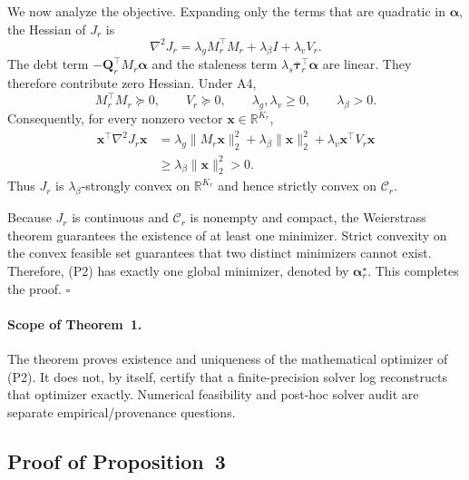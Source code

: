 We now analyze the objective.  Expanding only the terms that are quadratic in
$\boldsymbol\alpha$, the Hessian of $J_r$ is
\begin{equation}
 \nabla^2J_r
 =
 \lambda_gM_r^{\top}M_r
 +
 \lambda_{\beta}I
 +
 \lambda_vV_r.
 \label{eq:app_P2_hessian}
\end{equation}
The debt term
$-\mathbf{Q}_r^{\top}M_r\boldsymbol\alpha$ and the staleness term
$\lambda_s\overline{\boldsymbol\tau}_r^{\top}\boldsymbol\alpha$ are linear.
They therefore contribute zero Hessian.  Under A4,
\begin{equation}
    M_r^{\top}M_r\succeq0,
    \qquad
    V_r\succeq0,
    \qquad
    \lambda_g,\lambda_v\ge0,
    \qquad
    \lambda_{\beta}>0.
    \label{eq:app_psd_terms}
\end{equation}
Consequently, for every nonzero vector $\mathbf{x}\in\mathbb{R}^{K_r}$,
\begin{align}
 \mathbf{x}^{\top}\nabla^2J_r\mathbf{x}
 &=
 \lambda_g\|M_r\mathbf{x}\|_2^2
 +
 \lambda_{\beta}\|\mathbf{x}\|_2^2
 +
 \lambda_v\mathbf{x}^{\top}V_r\mathbf{x}
 \nonumber\\
 &\ge
 \lambda_{\beta}\|\mathbf{x}\|_2^2
 >0.
 \label{eq:app_strong_convex}
\end{align}
Thus $J_r$ is $\lambda_{\beta}$-strongly convex on
$\mathbb{R}^{K_r}$ and hence strictly convex on $\mathcal{C}_r$.

Because $J_r$ is continuous and $\mathcal{C}_r$ is nonempty and compact, the
Weierstrass theorem guarantees the existence of at least one minimizer.
Strict convexity on the convex feasible set guarantees that two distinct
minimizers cannot exist.  Therefore, (P2) has exactly one global minimizer,
denoted by $\boldsymbol\alpha_r^\star$.  This completes the proof.
\hfill$\square$

\paragraph{Scope of Theorem~1.}
The theorem proves existence and uniqueness of the mathematical optimizer of
(P2).  It does not, by itself, certify that a finite-precision solver log
reconstructs that optimizer exactly.  Numerical feasibility and post-hoc
solver audit are separate empirical/provenance questions.


\subsection{Proof of Proposition~3}
\label{app:proof_prop3}


